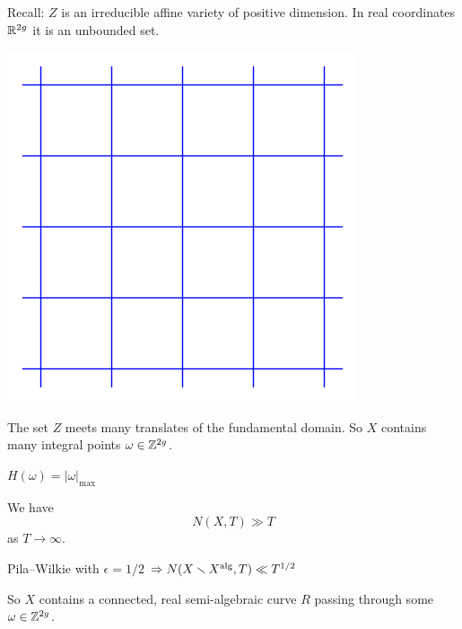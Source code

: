 \documentclass{beamer}
\begin{document}
\begin{frame}
  Recall:
  $Z$ is an irreducible  affine variety of positive
  dimension. In real coordinates ${\mathbb{R}}^{2g}$ it is an \alert{unbounded} set.
  \begin{minipage}{0.5\linewidth}
    \includegraphics[width=\textwidth]{grid.png}  
  \end{minipage}  \begin{minipage}{0.45\linewidth}
    The set $Z$ meets many translates of the fundamental domain.
    So $X$ contains many integral points $\omega\in{\mathbb{Z}}^{2g}$. 

    $H(\omega) = |\omega|_{\mathrm{max}}$
    
    We have $$N(X,T)\gg T$$ as $T\rightarrow\infty$. 
  \end{minipage}
  
  Pila--Wilkie with $\epsilon=1/2$ $\Rightarrow N(X\smallsetminus
  X^{\mathrm{alg}},T)\ll T^{1/2}$

  So $X$ contains a connected, real semi-algebraic curve $R$ passing
  through some $\omega\in{\mathbb{Z}}^{2g}$. 
\end{frame}
\end{document}
